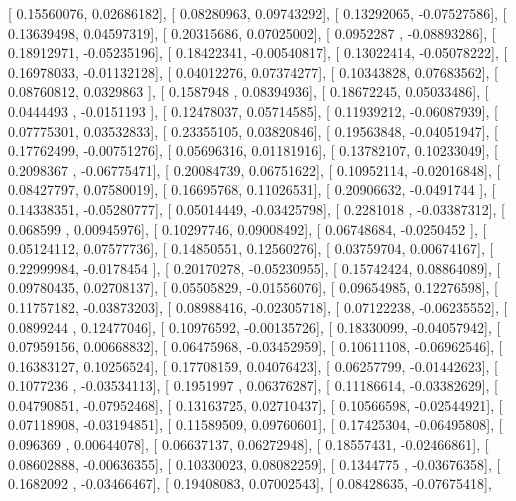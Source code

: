 \documentclass{article}
\begin{document}
       [ 0.15560076,  0.02686182],
       [ 0.08280963,  0.09743292],
       [ 0.13292065, -0.07527586],
       [ 0.13639498,  0.04597319],
       [ 0.20315686,  0.07025002],
       [ 0.0952287 , -0.08893286],
       [ 0.18912971, -0.05235196],
       [ 0.18422341, -0.00540817],
       [ 0.13022414, -0.05078222],
       [ 0.16978033, -0.01132128],
       [ 0.04012276,  0.07374277],
       [ 0.10343828,  0.07683562],
       [ 0.08760812,  0.0329863 ],
       [ 0.1587948 ,  0.08394936],
       [ 0.18672245,  0.05033486],
       [ 0.0444493 , -0.0151193 ],
       [ 0.12478037,  0.05714585],
       [ 0.11939212, -0.06087939],
       [ 0.07775301,  0.03532833],
       [ 0.23355105,  0.03820846],
       [ 0.19563848, -0.04051947],
       [ 0.17762499, -0.00751276],
       [ 0.05696316,  0.01181916],
       [ 0.13782107,  0.10233049],
       [ 0.2098367 , -0.06775471],
       [ 0.20084739,  0.06751622],
       [ 0.10952114, -0.02016848],
       [ 0.08427797,  0.07580019],
       [ 0.16695768,  0.11026531],
       [ 0.20906632, -0.0491744 ],
       [ 0.14338351, -0.05280777],
       [ 0.05014449, -0.03425798],
       [ 0.2281018 , -0.03387312],
       [ 0.068599  ,  0.00945976],
       [ 0.10297746,  0.09008492],
       [ 0.06748684, -0.0250452 ],
       [ 0.05124112,  0.07577736],
       [ 0.14850551,  0.12560276],
       [ 0.03759704,  0.00674167],
       [ 0.22999984, -0.0178454 ],
       [ 0.20170278, -0.05230955],
       [ 0.15742424,  0.08864089],
       [ 0.09780435,  0.02708137],
       [ 0.05505829, -0.01556076],
       [ 0.09654985,  0.12276598],
       [ 0.11757182, -0.03873203],
       [ 0.08988416, -0.02305718],
       [ 0.07122238, -0.06235552],
       [ 0.0899244 ,  0.12477046],
       [ 0.10976592, -0.00135726],
       [ 0.18330099, -0.04057942],
       [ 0.07959156,  0.00668832],
       [ 0.06475968, -0.03452959],
       [ 0.10611108, -0.06962546],
       [ 0.16383127,  0.10256524],
       [ 0.17708159,  0.04076423],
       [ 0.06257799, -0.01442623],
       [ 0.1077236 , -0.03534113],
       [ 0.1951997 ,  0.06376287],
       [ 0.11186614, -0.03382629],
       [ 0.04790851, -0.07952468],
       [ 0.13163725,  0.02710437],
       [ 0.10566598, -0.02544921],
       [ 0.07118908, -0.03194851],
       [ 0.11589509,  0.09760601],
       [ 0.17425304, -0.06495808],
       [ 0.096369  ,  0.00644078],
       [ 0.06637137,  0.06272948],
       [ 0.18557431, -0.02466861],
       [ 0.08602888, -0.00636355],
       [ 0.10330023,  0.08082259],
       [ 0.1344775 , -0.03676358],
       [ 0.1682092 , -0.03466467],
       [ 0.19408083,  0.07002543],
       [ 0.08428635, -0.07675418],
\end{document}
